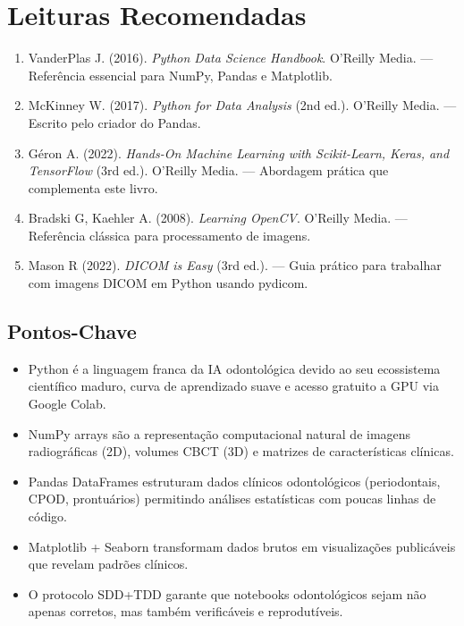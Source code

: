 \section{Leituras Recomendadas}
\begin{enumerate}
    \item VanderPlas J. (2016). \textit{Python Data Science Handbook}. O'Reilly Media. — Referência essencial para NumPy, Pandas e Matplotlib.
    \item McKinney W. (2017). \textit{Python for Data Analysis} (2nd ed.). O'Reilly Media. — Escrito pelo criador do Pandas.
    \item Géron A. (2022). \textit{Hands-On Machine Learning with Scikit-Learn, Keras, and TensorFlow} (3rd ed.). O'Reilly Media. — Abordagem prática que complementa este livro.
    \item Bradski G, Kaehler A. (2008). \textit{Learning OpenCV}. O'Reilly Media. — Referência clássica para processamento de imagens.
    \item Mason R (2022). \textit{DICOM is Easy} (3rd ed.). — Guia prático para trabalhar com imagens DICOM em Python usando pydicom.
\end{enumerate}

\subsection{Pontos-Chave}
\begin{itemize}
    \item Python é a linguagem franca da IA odontológica devido ao seu ecossistema científico maduro, curva de aprendizado suave e acesso gratuito a GPU via Google Colab.
    \item NumPy arrays são a representação computacional natural de imagens radiográficas (2D), volumes CBCT (3D) e matrizes de características clínicas.
    \item Pandas DataFrames estruturam dados clínicos odontológicos (periodontais, CPOD, prontuários) permitindo análises estatísticas com poucas linhas de código.
    \item Matplotlib + Seaborn transformam dados brutos em visualizações publicáveis que revelam padrões clínicos.
    \item O protocolo SDD+TDD garante que notebooks odontológicos sejam não apenas corretos, mas também verificáveis e reprodutíveis.
\end{itemize}

